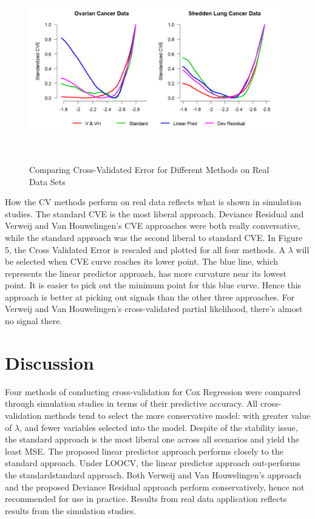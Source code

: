 \begin{figure}[h]
    \centering
		\includegraphics[height= 8cm ]{./figures/figure_5.png}
    \caption{Comparing Cross-Validated Error for Different Methods on Real Data Sets}
\end{figure}	

\par How the CV methods perform on real data reflects what is shown in simulation studies. The standard CVE is the most liberal approach. Deviance Residual and Verweij and Van Houwelingen's CVE approaches were both really conversative, while the standard approach was the second liberal to standard CVE. In Figure 5, the Cross Validated Error is rescaled and plotted for all four methods. A $\lambda$ will be selected when CVE curve reaches its lower point. The blue line, which represents the linear predictor approach, has more curvature near its lowest point. It is easier to pick out the minimum point for this blue curve. Hence this approach is better at picking out signals than the other three approaches. For Verweij and Van Houwelingen's cross-validated partial likelihood, there's almost no signal there.

\section{Discussion}

\par Four methods of conducting cross-validation for Cox Regression were compared through simulation studies in terms of their predictive accuracy. All cross-validation methods tend to select the more conservative model: with greater value of $\lambda$, and fewer variables selected into the model. Despite of the stability issue, the standard approach is the most liberal one across all scenarios and yield the least MSE. The proposed linear predictor approach performs closely to the standard approach. Under LOOCV, the linear predictor approach out-performs the standardstandard approach. Both Verweij and Van Houwelingen's approach and the proposed Deviance Residual approach perform conservatively, hence not recommended for use in practice. Results from real data application reflects results from the simulation studies.


